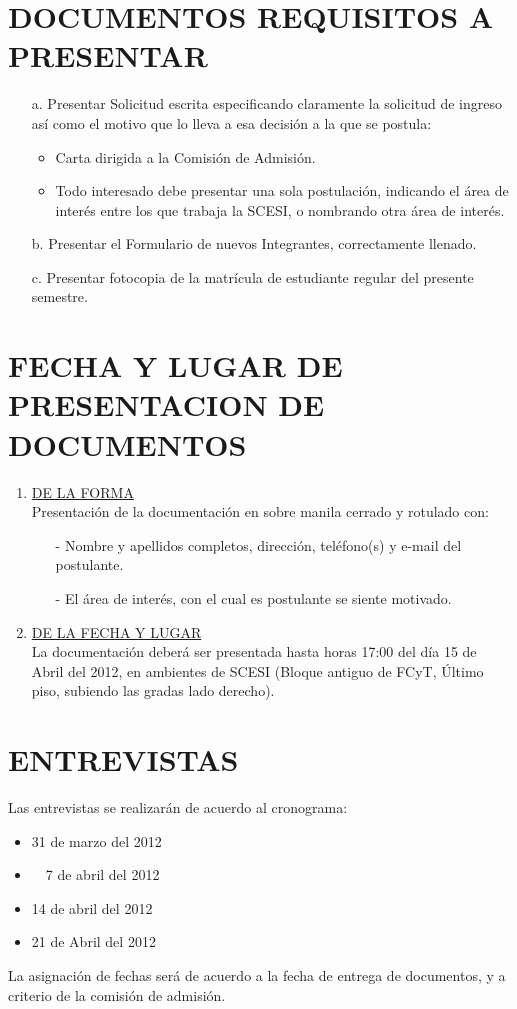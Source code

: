 \documentclass[11pt,letterpaper]{article}
\begin{document}
\section*{\bf \normalsize DOCUMENTOS REQUISITOS A PRESENTAR}
\begin{itemize}
\item[a.] Presentar Solicitud escrita especificando claramente la solicitud de ingreso así como el motivo que lo lleva a esa decisión a la que se postula:
\begin{itemize}
\item Carta dirigida a la Comisión de Admisión.
\item Todo interesado debe presentar una sola postulación, indicando el área de interés entre los que  trabaja la SCESI, o nombrando otra área de interés.
\end{itemize}
\item[b.] Presentar el Formulario de nuevos Integrantes, correctamente llenado.
\item[c.] Presentar fotocopia de la matrícula de estudiante regular del presente semestre.
\end{itemize}
\section*{\bf \normalsize FECHA Y LUGAR DE PRESENTACION DE DOCUMENTOS}
\begin{enumerate}
\item \underline{DE LA FORMA}\\
Presentación de la documentación en sobre manila cerrado y rotulado con:
\begin{itemize}
\item[-] Nombre y apellidos completos, dirección, teléfono(s) y e-mail del postulante.
\item[-] El área de interés, con el cual es postulante se siente motivado.
\end{itemize}
\item \underline{DE LA FECHA Y LUGAR}\\
La documentación deberá ser presentada hasta horas 17:00 del día 15 de Abril del 2012, en ambientes de SCESI (Bloque antiguo de FCyT, Último piso, subiendo las gradas lado derecho).
\end{enumerate}
\section*{\bf \normalsize ENTREVISTAS}
Las entrevistas se realizarán de acuerdo al cronograma:
\begin{itemize}
\item 31 de marzo del 2012
\item ~~7 de abril del 2012
\item 14 de abril del 2012
\item 21 de Abril del 2012
\end{itemize}
La asignación de fechas será de acuerdo a la fecha de entrega de documentos, y a criterio de la comisión de admisión.
\end{document}
